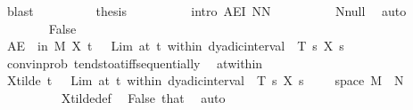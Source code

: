 \begin{isabellebody}
\ blast\isanewline
\ \ \ \ \ \ \isamarkupfalse%
\ \isamarkupfalse%
\ {\isacharquery}{\kern0pt}thesis\isanewline
\ \ \ \ \ \ \ \ \isamarkupfalse%
\ {\isacharparenleft}{\kern0pt}intro\ AE{\isacharunderscore}{\kern0pt}I{\isacharbrackleft}{\kern0pt}\ N{\isacharequal}{\kern0pt}{\isachardoublequoteopen}{\isacharquery}{\kern0pt}N{\isachardoublequoteclose}{\isacharbrackright}{\kern0pt}{\isacharparenright}{\kern0pt}\isanewline
\ \ \ \ \ \ \ \ \isamarkupfalse%
\ N{\isacharunderscore}{\kern0pt}null\ \isamarkupfalse%
\ auto\isanewline
\ \ \ \ \isamarkupfalse%
\isanewline
\ \ \ \ \ \ \isamarkupfalse%
\ False\isanewline
\ \ \ \ \ \ \isamarkupfalse%
\ {\isachardoublequoteopen}AE\ {\isasymomega}\ in\ {\isacharquery}{\kern0pt}M{\isachardot}{\kern0pt}\ X\ t\ {\isasymomega}\ {\isacharequal}{\kern0pt}\ Lim\ {\isacharparenleft}{\kern0pt}at\ t\ within\ dyadic{\isacharunderscore}{\kern0pt}interval\ {}\ T{\isacharparenright}{\kern0pt}\ {\isacharparenleft}{\kern0pt}{\isasymlambda}s{\isachardot}{\kern0pt}\ X\ s\ {\isasymomega}{\isacharparenright}{\kern0pt}{\isachardoublequoteclose}\isanewline
\ \ \ \ \ \ \ \ \isamarkupfalse%
\ conv{\isacharunderscore}{\kern0pt}in{\isacharunderscore}{\kern0pt}prob\ tendsto{\isacharunderscore}{\kern0pt}at{\isacharunderscore}{\kern0pt}iff{\isacharunderscore}{\kern0pt}sequentially\ \isamarkupfalse%
\ at{\isacharunderscore}{\kern0pt}within\ \isamarkupfalse%
\isanewline
\ \ \ \ \ \ \isamarkupfalse%
\ \isamarkupfalse%
\ {\isachardoublequoteopen}X{\isacharunderscore}{\kern0pt}tilde\ t\ {\isasymomega}\ {\isacharequal}{\kern0pt}\ Lim\ {\isacharparenleft}{\kern0pt}at\ t\ within\ dyadic{\isacharunderscore}{\kern0pt}interval\ {}\ T{\isacharparenright}{\kern0pt}\ {\isacharparenleft}{\kern0pt}{\isasymlambda}s{\isachardot}{\kern0pt}\ X\ s\ {\isasymomega}{\isacharparenright}{\kern0pt}{\isachardoublequoteclose}\ \ {\isachardoublequoteopen}{\isasymomega}\ {\isasymin}\ space\ {\isacharquery}{\kern0pt}M\ {\isacharminus}{\kern0pt}\ {\isacharquery}{\kern0pt}N{\isachardoublequoteclose}\ \ {\isasymomega}\isanewline
\ \ \ \ \ \ \ \ \isamarkupfalse%
\ X{\isacharunderscore}{\kern0pt}tilde{\isacharunderscore}{\kern0pt}def\ \isamarkupfalse%
\ False\ that\ \isamarkupfalse%
\ auto\isanewline

\end{isabellebody}
